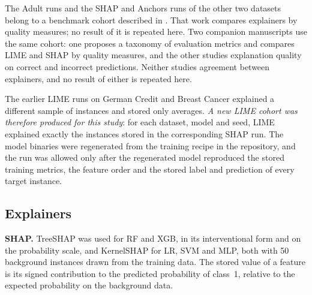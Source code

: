 The Adult runs and the SHAP and Anchors runs of the other two datasets belong to a
benchmark cohort described in \cite{herrera2026framework}. That work compares explainers
by quality measures; no result of it is repeated here.
Two companion manuscripts use the same cohort: one proposes a taxonomy of evaluation
metrics and compares LIME and SHAP by quality measures, and the other studies explanation
quality on correct and incorrect predictions. Neither studies agreement between
explainers, and no result of either is repeated here.

The earlier LIME runs on German Credit and Breast Cancer explained a different sample of
instances and stored only averages. \emph{A new LIME cohort was therefore produced for
this study}: for each dataset, model and seed, LIME explained exactly the instances
stored in the corresponding SHAP run. The model binaries were regenerated from the
training recipe in the repository, and the run was allowed only after the regenerated
model reproduced the stored training metrics, the feature order and the stored label and
prediction of every target instance.

\subsection{Explainers}
\label{sec:methods:explainers}

\textbf{SHAP.} TreeSHAP \cite{lundberg2020local} was used for RF and XGB, in its
interventional form and on the probability scale, and KernelSHAP
\cite{lundberg2017unified} for LR, SVM and MLP, both with 50 background instances drawn
from the training data. The stored value of a feature is its signed contribution to the
predicted probability of class~1, relative to the expected probability on the background
data.

